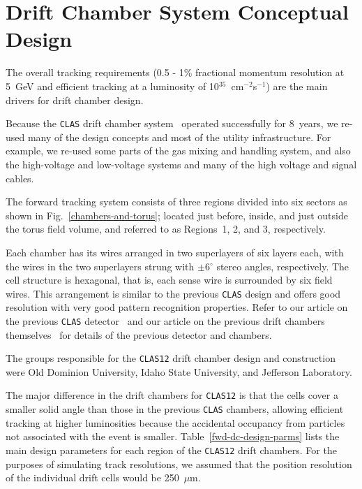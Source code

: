 \section{Drift Chamber System Conceptual Design}

The overall tracking requirements (0.5 -  1\% fractional momentum resolution 
at 5~GeV and efficient tracking at a luminosity of 
10$^{35}$~cm$^{-2}$s$^{-1}$) are the main drivers for drift chamber design.  

Because the {\tt CLAS} drift chamber system~\cite{dcnim} operated 
successfully for 8~years, we re-used many of the design concepts and 
most of the utility infrastructure.  For example, we re-used some
parts of the gas mixing and handling system, and also the high-voltage 
and low-voltage systems and many of the high voltage and signal cables. 

The forward tracking system consists of three regions divided into six
sectors as shown in Fig.~\ref{chambers-and-torus}; located just before, inside, 
and just outside the torus field volume, and referred to as Regions~1, 2, 
and 3, respectively.  

Each chamber has its wires arranged in two superlayers of
six layers each, with the wires in the two superlayers strung with 
$\pm$6$^\circ$ stereo angles, respectively.  The cell structure is 
hexagonal, that is, each sense wire is surrounded by six field wires.  This 
arrangement is similar to the previous {\tt CLAS} design and offers good 
resolution with very good pattern recognition properties.  Refer to our 
article on the previous {\tt CLAS} detector~\cite{clasnim} and our article 
on the previous drift chambers themselves~\cite{dcnim} for details of the 
previous detector and chambers.  

The groups responsible for the {\tt CLAS12} drift
chamber design and construction were Old Dominion University, Idaho State
University, and Jefferson Laboratory.

The major difference in the drift chambers for {\tt CLAS12} is that the 
cells cover a smaller solid angle than those in the previous {\tt CLAS} 
chambers, allowing efficient tracking at higher luminosities because the 
accidental occupancy from particles not associated with the event is smaller.  
Table~\ref{fwd-dc-design-parms} lists the main design parameters for each 
region of the {\tt CLAS12} drift chambers.  For the purposes of simulating 
track resolutions, we assumed that the position resolution of the individual 
drift cells would be 250~$\mu$m.  

